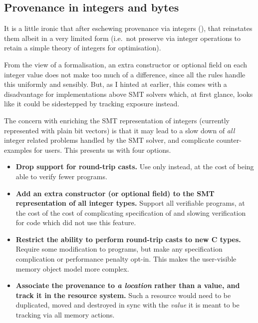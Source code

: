\subsection{Provenance in integers and bytes}\label{subsec:prov-int-bytes}

It is a little ironic that after eschewing provenance via integers (),
that  reinstates them albeit in a very limited form (i.e.\ not preserve
via integer operations to retain a simple theory of integers for optimisation).

From the view of a formalisation, an extra constructor or optional field on
each integer value does not make too much of a difference, since all the rules
handle this uniformly and sensibly. But, as I hinted at earlier, this comes
with a disadvantage for implementations above SMT solvers which, at first
glance, looks like it could be sidestepped by tracking exposure instead.

The concern with enriching the SMT representation of integers (currently
represented with plain bit vectors) is that it may lead to a slow down of
\emph{all} integer related problems handled by the SMT solver, and complicate
counter-examples for users. This presents us with four options.
\begin{itemize}
    \item \textbf{Drop support for round-trip casts.} Use only
         instead, at the cost of being able
        to verify fewer programs.
    \item \textbf{Add an extra constructor (or optional field) to the SMT
        representation of all integer types.} Support all  verifiable
        programs, at the cost of the cost of complicating specification of
        and slowing verification for code which did not use this feature.
    \item \textbf{Restrict the ability to perform round-trip casts to new C
        types.} Require some modification to  programs, but
        make any specification complication or performance penalty opt-in. This
        makes the user-visible memory object model more complex.\label{sn:optin-typedef-subtype}
    \item \textbf{Associate the provenance to \emph{a location} rather than a
        value, and track it in the resource system.} Such a resource would need
        to be duplicated, moved and destroyed in sync with the \emph{value} it
        is meant to be tracking via all memory actions.
\end{itemize}

